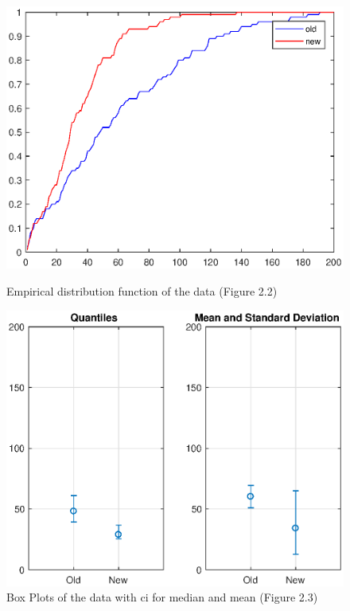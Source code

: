 \documentclass[11pt,a4paper]{article}
\begin{document}
\begin{figure}[ht]
	\centering
	\begin{minipage}{0.45\textwidth}
		\centering
		\includegraphics[width=\textwidth]{ex1fig2_2}
		\caption{Empirical distribution function of the data (Figure 2.2) }
		\label{fig:edf_exec}
	\end{minipage}
	\begin{minipage}{0.45\textwidth}
		\centering
		\includegraphics[width=\textwidth]{ex1fig2_3}
		\caption{Box Plots of the data with \gls{ci} for median and mean (Figure 2.3)}
		\label{fig:box_plots_exec}
	\end{minipage}
\end{figure}
\end{document}
